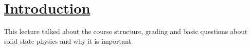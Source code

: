 \section[Introduction]{\hyperlink{toc}{Introduction}}

This lecture talked about the course structure, grading and basic questions about solid state physics and why it is important.

